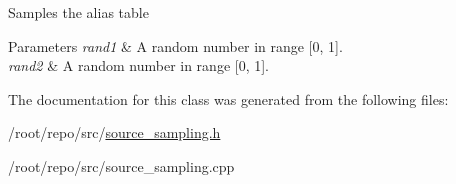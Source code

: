 Samples the alias table 
\begin{DoxyParams}{Parameters}
{\em rand1} & A random number in range \mbox{[}0, 1\mbox{]}. \\
\hline
{\em rand2} & A random number in range \mbox{[}0, 1\mbox{]}. \\
\hline
\end{DoxyParams}


The documentation for this class was generated from the following files\+:\begin{DoxyCompactItemize}
\item 
/root/repo/src/\hyperlink{source__sampling_8h}{source\+\_\+sampling.\+h}\item 
/root/repo/src/source\+\_\+sampling.\+cpp\end{DoxyCompactItemize}
